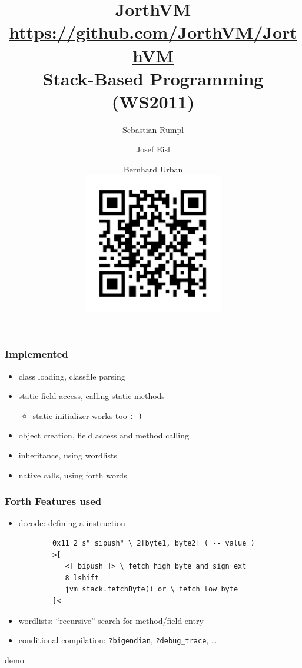 \documentclass{beamer}
\title{JorthVM\\[0.2cm]\url{https://github.com/JorthVM/JorthVM}\\\small{Stack-Based Programming (WS2011)}}
\author{Sebastian Rumpl \and Josef Eisl \and Bernhard
Urban\\\includegraphics{../github}\vspace{-1cm}}
\begin{document}
\frame{\titlepage}
\begin{frame}
	\frametitle{Implemented}
	\begin{itemize}
		\item class loading, classfile parsing
		\item static field access, calling static methods
		\begin{itemize}
			\item static initializer works too \texttt{:-)}
		\end{itemize}
		\item object creation, field access and method calling
		\item inheritance, using wordlists
		\item native calls, using forth words
	\end{itemize}
\end{frame}

\lstset{
	basicstyle=\scriptsize
}
\begin{frame}[fragile]
	\frametitle{Forth Features used}
	
	\begin{itemize}
		\item decode: defining a instruction
		\begin{lstlisting}
		0x11 2 s" sipush" \ 2[byte1, byte2] ( -- value )
		>[
		   <[ bipush ]> \ fetch high byte and sign ext
		   8 lshift
		   jvm_stack.fetchByte() or \ fetch low byte
		]<
		\end{lstlisting}
		\pause
		\item wordlists: ``recursive'' search for method/field entry
		\pause
		\item conditional compilation: \texttt{?bigendian},
		\texttt{?debug\_trace}, \dots
	\end{itemize}
\end{frame}

\begin{frame}
	\begin{center}
		demo
	\end{center}
\end{frame}
\end{document}
